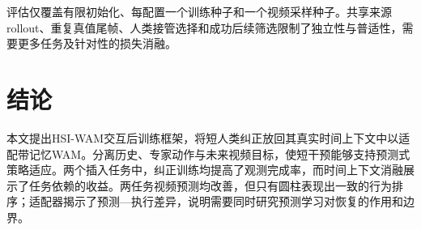 \documentclass[letterpaper,10pt,conference]{ieeeconf}
\begin{document}
评估仅覆盖有限初始化、每配置一个训练种子和一个视频采样种子。共享来源rollout、重复真值尾帧、人类接管选择和成功后续筛选限制了独立性与普适性，需要更多任务及针对性的损失消融。

\section{结论}
本文提出HSI-WAM交互后训练框架，将短人类纠正放回其真实时间上下文中以适配带记忆WAM。分离历史、专家动作与未来视频目标，使短干预能够支持预测式策略适应。两个插入任务中，纠正训练均提高了观测完成率，而时间上下文消融展示了任务依赖的收益。两任务视频预测均改善，但只有圆柱表现出一致的行为排序；适配器揭示了预测—执行差异，说明需要同时研究预测学习对恢复的作用和边界。



\end{document}
